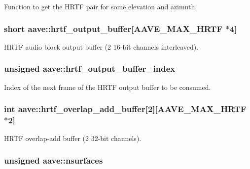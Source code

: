 Function to get the H\-R\-T\-F pair for some elevation and azimuth. \hypertarget{structaave_a4aabeeaaa2fd6eecaa74cf9ff6a4a75c}{
\subsubsection[{hrtf\-\_\-output\-\_\-buffer}]{\setlength{\rightskip}{0pt plus 5cm}short aave\-::hrtf\-\_\-output\-\_\-buffer\mbox{[}{\bf A\-A\-V\-E\-\_\-\-M\-A\-X\-\_\-\-H\-R\-T\-F} $\ast$4\mbox{]}}}\label{structaave_a4aabeeaaa2fd6eecaa74cf9ff6a4a75c}
H\-R\-T\-F audio block output buffer (2 16-\/bit channels interleaved). \hypertarget{structaave_a50881090e68ae1bde54b091757b99d64}{
\subsubsection[{hrtf\-\_\-output\-\_\-buffer\-\_\-index}]{\setlength{\rightskip}{0pt plus 5cm}unsigned aave\-::hrtf\-\_\-output\-\_\-buffer\-\_\-index}}\label{structaave_a50881090e68ae1bde54b091757b99d64}
Index of the next frame of the H\-R\-T\-F output buffer to be consumed. \hypertarget{structaave_a591c8877020f861da25632f35f67c3b4}{
\subsubsection[{hrtf\-\_\-overlap\-\_\-add\-\_\-buffer}]{\setlength{\rightskip}{0pt plus 5cm}int aave\-::hrtf\-\_\-overlap\-\_\-add\-\_\-buffer\mbox{[}2\mbox{]}\mbox{[}{\bf A\-A\-V\-E\-\_\-\-M\-A\-X\-\_\-\-H\-R\-T\-F} $\ast$2\mbox{]}}}\label{structaave_a591c8877020f861da25632f35f67c3b4}
H\-R\-T\-F overlap-\/add buffer (2 32-\/bit channels). \hypertarget{structaave_a46897bdef9912d50cecb6b93c8c894a6}{
\subsubsection[{nsurfaces}]{\setlength{\rightskip}{0pt plus 5cm}unsigned aave\-::nsurfaces}}\label{structaave_a46897bdef9912d50cecb6b93c8c894a6}
